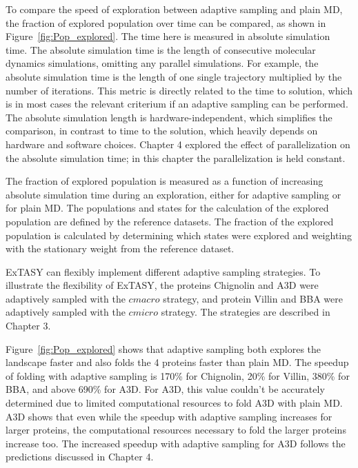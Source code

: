 To compare the speed of exploration between adaptive sampling and plain MD, the fraction of explored population over time can be compared, as shown in Figure~\ref{fig:Pop_explored}. The time here is measured in absolute simulation time. The absolute simulation time is the length of consecutive molecular dynamics simulations, omitting any parallel simulations. For example, the absolute simulation time is the length of one single trajectory multiplied by the number of iterations. This metric is directly related to the time to solution, which is in most cases the relevant criterium if an adaptive sampling can be performed. The absolute simulation length is hardware-independent, which simplifies the comparison, in contrast to time to the solution, which heavily depends on hardware and software choices. Chapter 4 explored the effect of parallelization on the absolute simulation time; in this chapter the parallelization is held constant.

The fraction of explored population is measured as a function of increasing absolute simulation time during an exploration, either for adaptive sampling or for plain MD. The populations and states for the calculation of the explored population are defined by the reference datasets. The fraction of the explored population is calculated by determining which states were explored and weighting with the stationary weight from the reference dataset.

ExTASY can flexibly implement different adaptive sampling strategies. To illustrate the flexibility of ExTASY, the proteins Chignolin and A3D were adaptively sampled with the $cmacro$ strategy, and protein Villin and BBA were adaptively sampled with the $cmicro$ strategy. The strategies are described in Chapter 3. 

Figure~\ref{fig:Pop_explored} shows that adaptive sampling both explores the landscape faster and also folds the 4 proteins faster than plain MD. The speedup of folding with adaptive sampling is 170\% for Chignolin, 20\% for Villin, 380\% for BBA, and above 690\% for A3D. For A3D, this value couldn't be accurately determined due to limited computational resources to fold A3D with plain MD. A3D shows that even while the speedup with adaptive sampling increases for larger proteins, the computational resources necessary to fold the larger proteins increase too. The increased speedup with adaptive sampling for A3D follows the predictions discussed in Chapter 4.  

